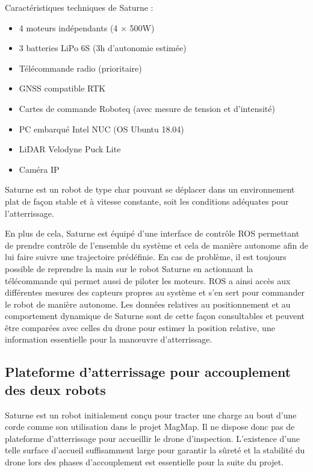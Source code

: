 Caractéristiques techniques de Saturne :
\begin{itemize}
    \item 4 moteurs indépendants (4 $\times$ 500W)
    \item 3 batteries LiPo 6S (3h d’autonomie estimée)
    \item Télécommande radio (prioritaire)
    \item GNSS compatible RTK
    \item Cartes de commande Roboteq (avec mesure de tension et d’intensité)
    \item PC embarqué Intel NUC (OS Ubuntu 18.04)
    \item LiDAR Velodyne Puck Lite
    \item Caméra IP
\end{itemize}

Saturne est un robot de type char pouvant se déplacer dans un environnement plat de façon stable et à vitesse constante, soit les conditions adéquates pour l'atterrissage.

En plus de cela, Saturne est équipé d’une interface de contrôle ROS permettant de prendre contrôle de l’ensemble du système et cela de manière autonome afin de lui faire suivre une trajectoire prédéfinie. En cas de problème, il est toujours possible de reprendre la main sur le robot Saturne en actionnant la télécommande qui permet aussi de piloter les moteurs.
ROS a ainsi accès aux différentes mesures des capteurs propres au système et s’en sert pour commander le robot de manière autonome. Les données relatives au positionnement et au comportement dynamique de Saturne sont de cette façon consultables et peuvent être comparées avec celles du drone pour estimer la position relative, une information essentielle pour la manœuvre d’atterrissage.

\subsection{Plateforme d'atterrissage pour accouplement des deux robots}

Saturne est un robot initialement conçu pour tracter une charge au bout d’une corde comme son utilisation dans le projet MagMap. Il ne dispose donc pas de plateforme d’atterrissage pour accueillir le drone d’inspection. L’existence d’une telle surface d’accueil suffisamment large pour garantir la sûreté et la stabilité du drone lors des phases d’accouplement est essentielle pour la suite du projet.

